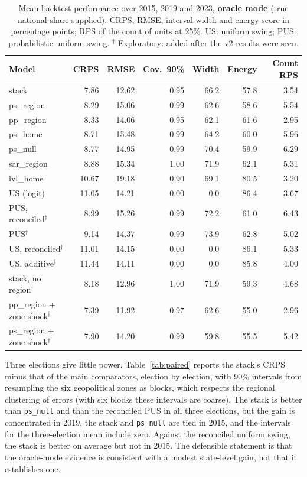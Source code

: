 \documentclass[preprint,12pt,authoryear]{elsarticle}
\begin{document}
\begin{table}[ht]
\centering
\caption{Mean backtest performance over 2015, 2019 and 2023, \textbf{oracle mode} (true national share supplied). CRPS, RMSE, interval width and energy score in percentage points; RPS of the count of units at 25\%. US: uniform swing; PUS: probabilistic uniform swing. $^\dagger$ Exploratory: added after the v2 results were seen.}
\label{tab:results_oracle}
\small
\setlength{\tabcolsep}{3pt}
\begin{tabular}{lrrrrrr}
\toprule
Model & CRPS & RMSE & Cov.\ 90\% & Width & Energy & Count RPS \\
\midrule
stack & 7.86 & 12.62 & 0.95 & 66.2 & 57.8 & 3.54 \\
ps\_region & 8.29 & 15.06 & 0.99 & 62.6 & 58.6 & 5.54 \\
pp\_region & 8.33 & 14.06 & 0.95 & 62.1 & 61.6 & 2.95 \\
ps\_home & 8.71 & 15.48 & 0.99 & 64.2 & 60.0 & 5.96 \\
ps\_null & 8.77 & 14.95 & 0.99 & 70.4 & 59.9 & 6.29 \\
sar\_region & 8.88 & 15.34 & 1.00 & 71.9 & 62.1 & 5.31 \\
lvl\_home & 10.67 & 19.18 & 0.90 & 69.1 & 80.5 & 3.20 \\
US (logit) & 11.05 & 14.21 & 0.00 & 0.0 & 86.4 & 3.67 \\
\midrule
PUS, reconciled$^\dagger$ & 8.99 & 15.26 & 0.99 & 72.2 & 61.0 & 6.43 \\
PUS$^\dagger$ & 9.14 & 14.37 & 0.99 & 73.9 & 62.8 & 5.02 \\
US, reconciled$^\dagger$ & 11.01 & 14.15 & 0.00 & 0.0 & 86.1 & 5.33 \\
US, additive$^\dagger$ & 11.44 & 14.11 & 0.00 & 0.0 & 85.8 & 4.00 \\
stack, no region$^\dagger$ & 8.18 & 12.96 & 1.00 & 71.9 & 59.3 & 4.68 \\
pp\_region + zone shock$^\dagger$ & 7.39 & 11.92 & 0.97 & 62.6 & 55.0 & 2.96 \\
ps\_region + zone shock$^\dagger$ & 7.90 & 14.20 & 0.99 & 59.8 & 55.5 & 5.42 \\
\bottomrule
\end{tabular}
\end{table}

Three elections give little power. Table~\ref{tab:paired} reports the stack's CRPS minus that of the main comparators, election by election, with 90\% intervals from resampling the six geopolitical zones as blocks, which respects the regional clustering of errors (with six blocks these intervals are coarse). The stack is better than \texttt{ps\_null} and than the reconciled PUS in all three elections, but the gain is concentrated in 2019, the stack and \texttt{ps\_null} are tied in 2015, and the intervals for the three-election mean include zero. Against the reconciled uniform swing, the stack is better on average but not in 2015. The defensible statement is that the oracle-mode evidence is consistent with a modest state-level gain, not that it establishes one.
\end{document}
